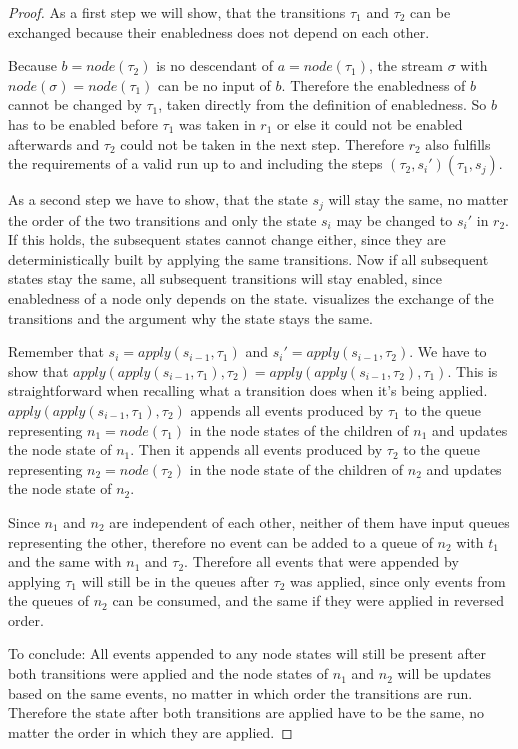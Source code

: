 \begin{proof}
  As a first step we will show, that the transitions \(\tau_1\) and \(\tau_2\) can be exchanged because their enabledness does not depend on each other.

  Because \(b = \mathit{node}(\tau_2)\) is no descendant of \(a = \mathit{node}(\tau_1)\), the stream \(\sigma\) with \(\mathit{node}(\sigma) = \mathit{node}(\tau_1)\) can be no input of \(b\).
  Therefore the enabledness of \(b\) cannot be changed by \(\tau_1\), taken directly from the definition of enabledness.
  So \(b\) has to be enabled before \(\tau_1\) was taken in \(r_1\) or else it could not be enabled afterwards and \(\tau_2\) could not be taken in the next step.
  Therefore \(r_2\) also fulfills the requirements of a valid run up to and including the steps \((\tau_2,s_i')(\tau_1,s_j)\).

  As a second step we have to show, that the state \(s_j\) will stay the same, no matter the order of the two transitions and only the state \(s_i\) may be changed to \(s_i'\) in \(r_2\).
  If this holds, the subsequent states cannot change either, since they are deterministically built by applying the same transitions.
  Now if all subsequent states stay the same, all subsequent transitions will stay enabled, since enabledness of a node only depends on the state.
   visualizes the exchange of the transitions and the argument why the state stays the same.

  Remember that \(s_i = \mathit{apply}(s_{i-1}, \tau_1)\) and \(s_i' = \mathit{apply}(s_{i-1}, \tau_2)\).
  We have to show that \(\mathit{apply}(\mathit{apply}(s_{i-1}, \tau_1),\tau_2) = \mathit{apply}(\mathit{apply}(s_{i-1}, \tau_2),\tau_1)\).
  This is straightforward when recalling what a transition does when it's being applied.
  \(\mathit{apply}(\mathit{apply}(s_{i-1}, \tau_1),\tau_2)\) appends all events produced by \(\tau_1\) to the queue representing \(n_1 = \mathit{node}(\tau_1)\) in the node states of the children of \(n_1\) and updates the node state of \(n_1\).
  Then it appends all events produced by \(\tau_2\) to the queue representing \(n_2 = \mathit{node}(\tau_2)\) in the node state of the children of \(n_2\) and updates the node state of \(n_2\).

  Since \(n_1\) and \(n_2\) are independent of each other, neither of them have input queues representing the other, therefore no event can be added to a queue of \(n_2\) with \(t_1\) and the same with \(n_1\) and \(\tau_2\).
  Therefore all events that were appended by applying \(\tau_1\) will still be in the queues after \(\tau_2\) was applied, since only events from the queues of \(n_2\) can be consumed, and the same if they were applied in reversed order.

  To conclude: All events appended to any node states will still be present after both transitions were applied and the node states of \(n_1\) and \(n_2\) will be updates based on the same events, no matter in which order the transitions are run.
  Therefore the state after both transitions are applied have to be the same, no matter the order in which they are applied.

\end{proof}

